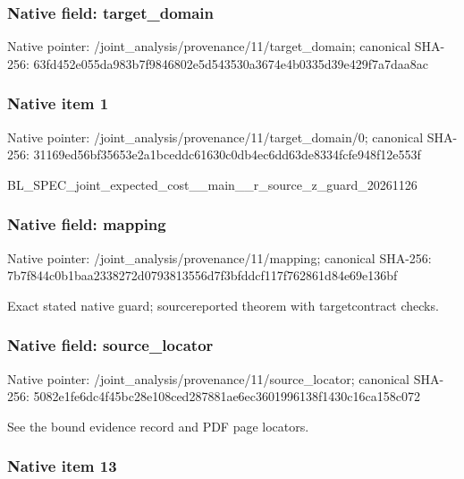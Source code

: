 \documentclass[10pt,a4paper]{article}
\begin{document}
\subsubsection{Native field: target\_domain}


Native pointer: /joint\_analysis/provenan\allowbreak{}ce/11/target\_domain; canonical SHA-256: 63fd452e055da983b7f98468\allowbreak{}02e5d543530a3674e4b0335d\allowbreak{}39e429f7a7daa8ac



\subsubsection{Native item 1}


Native pointer: /joint\_analysis/provenan\allowbreak{}ce/11/target\_domain/0; canonical SHA-256: 31169ed56bf35653e2a1bced\allowbreak{}dc61630c0db4ec6dd63de833\allowbreak{}4fcfe948f12e553f


BL\_SPEC\_joint\_expected\_c\allowbreak{}ost\_\_main\_\_r\_source\_z\_gu\allowbreak{}ard\_20261126


\subsubsection{Native field: mapping}


Native pointer: /joint\_analysis/provenance/11/mapping; canonical SHA-256: 7b7f844c0b1baa2338272d07\allowbreak{}93813556d7f3bfddcf117f76\allowbreak{}2861d84e69e136bf


Exact stated native guard; sourcereported theorem with targetcontract checks.


\subsubsection{Native field: source\_locator}


Native pointer: /joint\_analysis/provenan\allowbreak{}ce/11/source\_locator; canonical SHA-256: 5082e1fe6dc4f45bc28e108c\allowbreak{}ed287881ae6ec3601996138f\allowbreak{}1430c16ca158c072


See the bound evidence record and PDF page locators.


\subsubsection{Native item 13}
\end{document}

